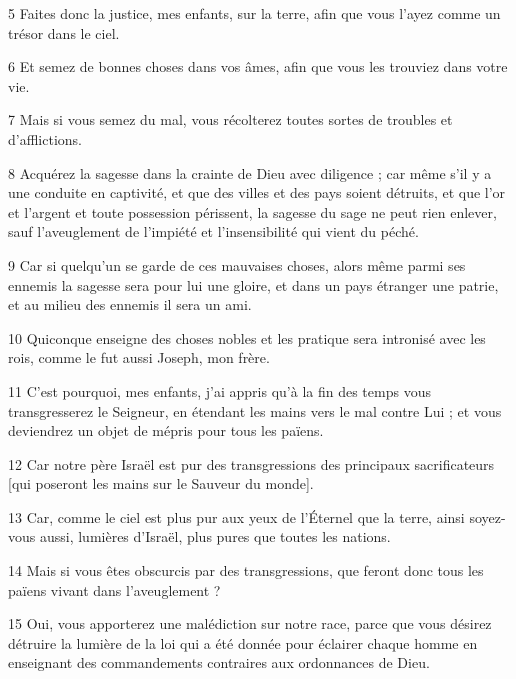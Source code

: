 \par 5 Faites donc la justice, mes enfants, sur la terre, afin que vous l'ayez comme un trésor dans le ciel.

\par 6 Et semez de bonnes choses dans vos âmes, afin que vous les trouviez dans votre vie.

\par 7 Mais si vous semez du mal, vous récolterez toutes sortes de troubles et d'afflictions.

\par 8 Acquérez la sagesse dans la crainte de Dieu avec diligence ; car même s'il y a une conduite en captivité, et que des villes et des pays soient détruits, et que l'or et l'argent et toute possession périssent, la sagesse du sage ne peut rien enlever, sauf l'aveuglement de l'impiété et l'insensibilité qui vient du péché.

\par 9 Car si quelqu'un se garde de ces mauvaises choses, alors même parmi ses ennemis la sagesse sera pour lui une gloire, et dans un pays étranger une patrie, et au milieu des ennemis il sera un ami.

\par 10 Quiconque enseigne des choses nobles et les pratique sera intronisé avec les rois, comme le fut aussi Joseph, mon frère.

\par 11 C'est pourquoi, mes enfants, j'ai appris qu'à la fin des temps vous transgresserez le Seigneur, en étendant les mains vers le mal contre Lui ; et vous deviendrez un objet de mépris pour tous les païens.

\par 12 Car notre père Israël est pur des transgressions des principaux sacrificateurs [qui poseront les mains sur le Sauveur du monde].

\par 13 Car, comme le ciel est plus pur aux yeux de l'Éternel que la terre, ainsi soyez-vous aussi, lumières d'Israël, plus pures que toutes les nations.

\par 14 Mais si vous êtes obscurcis par des transgressions, que feront donc tous les païens vivant dans l'aveuglement ?

\par 15 Oui, vous apporterez une malédiction sur notre race, parce que vous désirez détruire la lumière de la loi qui a été donnée pour éclairer chaque homme en enseignant des commandements contraires aux ordonnances de Dieu.

